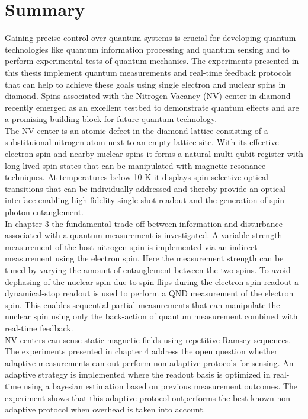 \chapter{Summary}

Gaining precise control over quantum systems is crucial for developing quantum technologies like quantum information processing and quantum sensing and to perform experimental tests of quantum mechanics. The experiments presented in this thesis implement quantum measurements and real-time feedback protocols that can help to achieve these goals using single electron and nuclear spins in diamond. Spins associated with the Nitrogen Vacancy (NV) center in diamond recently emerged as an excellent testbed to demonstrate quantum effects and are a promising building block for future quantum technology.\\

The NV center is an atomic defect in the diamond lattice consisting of a substituional nitrogen atom next to an empty lattice site. With its effective electron spin and nearby nuclear spins it forms a natural multi-qubit register with long-lived spin states that can be manipulated with magnetic resonance techniques. At temperatures below 10 K it displays spin-selective optical transitions that can be individually addressed and thereby provide an optical interface enabling high-fidelity single-shot readout and the generation of spin-photon entanglement.\\

In chapter 3 the fundamental trade-off between information and disturbance associated with a quantum measurement is investigated. A variable strength measurement of the host nitrogen spin is implemented via an indirect measurement using the electron spin. Here the measurement strength can be tuned by varying the amount of entanglement between the two spins. To avoid dephasing of the nuclear spin due to spin-flips during the electron spin readout a dynamical-stop readout is used to perform a QND measurement of the electron spin. This enables sequential partial measurements that can manipulate the nuclear spin using only the back-action of quantum measurement combined with real-time feedback. \\

NV centers can sense static magnetic fields using repetitive Ramsey sequences. The experiments presented in chapter 4 address the open question whether adaptive measurements can out-perform non-adaptive protocols for sensing. An adaptive strategy is implemented where the readout basis is optimized in real-time using a bayesian estimation based on previous measurement outcomes. The experiment shows that this adaptive protocol outperforms the best known non-adaptive protocol when overhead is taken into account.\\

